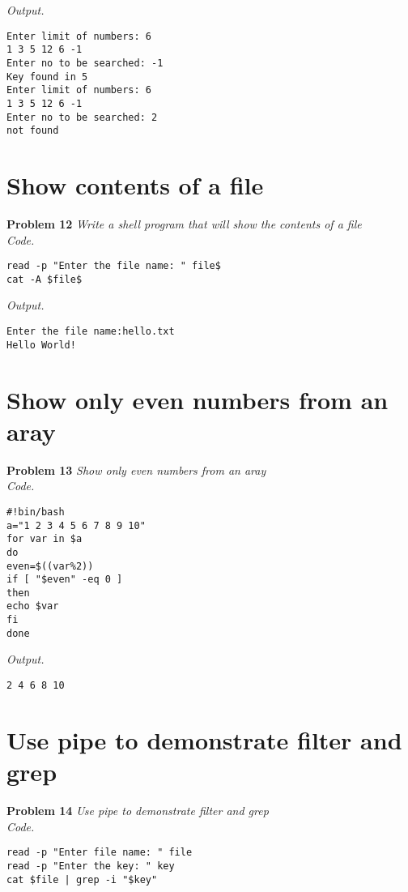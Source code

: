 \documentclass[12pt]{article}
\begin{document}
\textit{Output.}
\begin{lstlisting}
Enter limit of numbers: 6
1 3 5 12 6 -1
Enter no to be searched: -1
Key found in 5
Enter limit of numbers: 6
1 3 5 12 6 -1
Enter no to be searched: 2
not found
\end{lstlisting}

\section{Show contents of a file}

\textbf{Problem 12} \textit{Write a shell program that will show the contents of a file}\\

\textit{Code.}

\begin{lstlisting}
read -p "Enter the file name: " file$
cat -A $file$
\end{lstlisting}

\textit{Output.}
\begin{lstlisting}
Enter the file name:hello.txt
Hello World!
\end{lstlisting}

\section{Show only even numbers from an aray}

\textbf{Problem 13} \textit{Show only even numbers from an aray}\\

\textit{Code.}

\begin{lstlisting}
#!bin/bash
a="1 2 3 4 5 6 7 8 9 10"
for var in $a
do
even=$((var%2))
if [ "$even" -eq 0 ]
then
echo $var
fi
done
\end{lstlisting}

\textit{Output.}
\begin{lstlisting}
2 4 6 8 10
\end{lstlisting}

\section{Use pipe to demonstrate filter and grep}

\textbf{Problem 14} \textit{Use pipe to demonstrate filter and grep}\\

\textit{Code.}

\begin{lstlisting}
read -p "Enter file name: " file
read -p "Enter the key: " key
cat $file | grep -i "$key"
\end{lstlisting}
\end{document}
